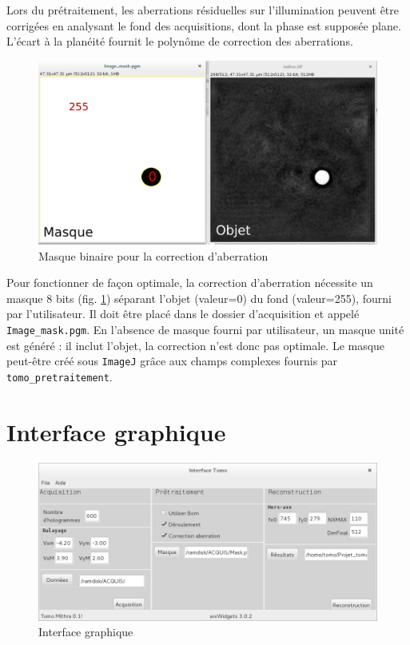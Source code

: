 \documentclass[	french,DIV=calc,%
							paper=a4,%
							fontsize=11pt,%
							twocolumn]{scrartcl}	 					%
\newcommand{\code}[1]{\texttt{#1}}
\begin{document}
Lors du prétraitement, les aberrations résiduelles
sur l’illumination peuvent être corrigées en analysant le fond des acquisitions, dont la phase est supposée plane. L’écart à la planéité fournit le polynôme de correction des aberrations. 

\begin{figure}
	\includegraphics[scale=0.28]{images/masque_aberration.pdf}
	\caption{Masque binaire pour la correction d'aberration}\label{aberration_masque}
\end{figure}

Pour fonctionner de façon optimale, la correction d’aberration nécessite un masque 8 bits (fig.
\ref{aberration_masque}) séparant l’objet (valeur=0) du fond (valeur=255), fourni par l’utilisateur. Il doit être placé dans le dossier d’acquisition  et appelé \code{Image\_mask.pgm}.
En l’absence de masque fourni par utilisateur, un masque unité est généré : il inclut l’objet, la correction n’est donc pas optimale. Le masque peut-être
créé sous \code{ImageJ} grâce aux champs complexes fournis par \code{tomo\_pretraitement}.

\section{Interface graphique}

\begin{figure}
	\includegraphics[scale=0.28]{images/Interface_Tomo.jpg}
	\caption{Interface graphique}\label{tomo_gui}
\end{figure}
\end{document}
